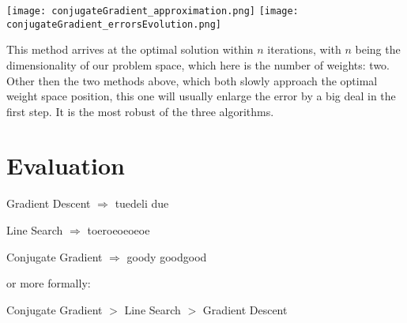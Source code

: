 \documentclass[a4paper,headings=small]{scrartcl}
\numberwithin{equation}{section} %
\numberwithin{figure}{section}   %
\begin{document}
\texttt{[image: conjugateGradient\_approximation.png]}
\texttt{[image: conjugateGradient\_errorsEvolution.png]}

This method arrives at the optimal solution within $n$ iterations,
with $n$ being the dimensionality of our problem space,
which here is the number of weights: two.
Other then the two methods above, which both slowly approach the optimal
weight space position, this one will usually enlarge the error by a big deal
in the first step.
It is the most robust of the three algorithms.


\newpage
\section{Evaluation}

\begin{list}{}{}
	\item Gradient Descent $\Rightarrow$ tuedeli due
	\item Line Search $\Rightarrow$ toeroeoeoeoe
	\item Conjugate Gradient $\Rightarrow$ goody goodgood
\end{list}


or more formally:
\begin{list}{}{}
	\item Conjugate Gradient $>$ Line Search $>$ Gradient Descent
\end{list}
\end{document}
